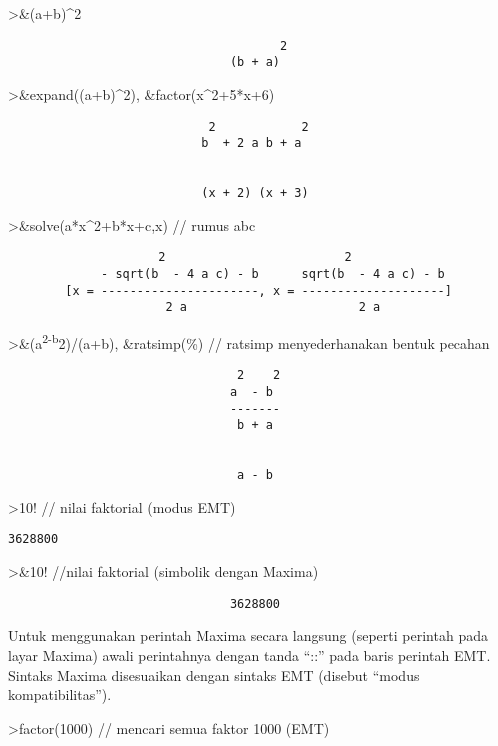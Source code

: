 \documentclass[
]{book}
\begin{document}
\textgreater\&(a+b)\^{}2

\begin{verbatim}
                                      2
                               (b + a)
\end{verbatim}

\textgreater\&expand((a+b)\^{}2), \&factor(x\^{}2+5*x+6)

\begin{verbatim}
                            2            2
                           b  + 2 a b + a


                           (x + 2) (x + 3)
\end{verbatim}

\textgreater\&solve(a*x\^{}2+b*x+c,x) // rumus abc

\begin{verbatim}
                     2                         2
             - sqrt(b  - 4 a c) - b      sqrt(b  - 4 a c) - b
        [x = ----------------------, x = --------------------]
                      2 a                        2 a
\end{verbatim}

\textgreater\&(a\textsuperscript{2-b}2)/(a+b), \&ratsimp(\%) // ratsimp menyederhanakan bentuk pecahan

\begin{verbatim}
                                2    2
                               a  - b
                               -------
                                b + a


                                a - b
\end{verbatim}

\textgreater10! // nilai faktorial (modus EMT)

\begin{verbatim}
3628800
\end{verbatim}

\textgreater\&10! //nilai faktorial (simbolik dengan Maxima)

\begin{verbatim}
                               3628800
\end{verbatim}

Untuk menggunakan perintah Maxima secara langsung (seperti perintah pada layar Maxima) awali perintahnya dengan tanda ``::'' pada baris perintah EMT. Sintaks Maxima disesuaikan dengan sintaks EMT (disebut ``modus kompatibilitas'').

\textgreater factor(1000) // mencari semua faktor 1000 (EMT)
\end{document}
